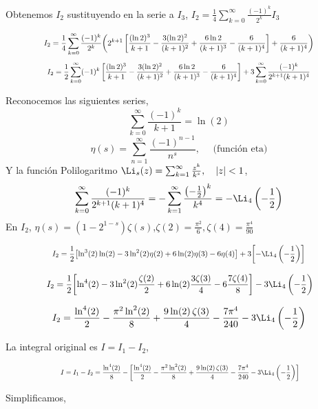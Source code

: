 { 

Obtenemos $I_2$  sustituyendo en la serie a $I_3$, $I_2 = \frac{1}{4}\sum_{k=0}^\infty \frac{(-1)^k}{2^k} I_3$
 
\begin{equation*}
	\scalebox{0.8}{$\displaystyle	I_2 = \frac{1}{4}\sum_{k=0}^\infty \frac{(-1)^k}{2^k}\pqty{  2^{k+1}\left[\frac{(\ln 2)^3}{k+1} - \frac{3(\ln 2)^2}{(k+1)^2} + \frac{6\ln 2}{(k+1)^3} - \frac{6}{(k+1)^4}\right] + \frac{6}{(k+1)^4} } $}
\end{equation*} 
\begin{equation*}
	\scalebox{0.77}{$\displaystyle	I_2 = \frac{1}{2}\sum_{k=0}^\infty (-1)^k\left[\frac{(\ln 2)^3}{k+1} - \frac{3(\ln 2)^2}{(k+1)^2} + \frac{6\ln 2}{(k+1)^3} - \frac{6}{(k+1)^4}\right] + 3\sum_{k=0}^\infty \frac{(-1)^k}{2^{k+1}(k+1)^4} $}
\end{equation*}
 

Reconocemos las siguientes series,
 $$\sum_{k=0}^\infty \frac{(-1)^k}{k+1}  = \ln(2)$$ 
 $$ \eta(s) = \sum_{n=1}^{\infty} \frac{(-1)^{n-1}}{n^s}, \quad  \text{ (función eta)} $$ 
 Y la función Polilogaritmo $\Li_s(z) = \sum_{k=1}^\infty \frac{z^k}{k^s},\quad \abs{z}<1$,
 $$
 \sum_{k=0}^\infty \frac{(-1)^k}{2^{k+1}(k+1)^4}  =
  -\sum_{k=1}^\infty \frac{\pqty{- \frac{1}{2}}^{k} }{k^4}  =-\Li_4\left(-\frac{1}{2}\right) 
  $$
En $I_2$, \quad  $\eta(s) = (1 - 2^{1-s}) \zeta(s)$,\quad $\zeta(2)=\frac{\pi^2}{6}, \zeta(4)=\frac{\pi^4}{90}$%
 
\begin{equation*}
	\scalebox{0.8}{$\displaystyle 
		I_2=\frac{1}{2}\bqty{\ln^3(2)\ln(2)- 3\ln^2(2)\eta(2)+ 6\ln(2)\eta(3)-6\eta(4)}+3\bqty{ -\Li_4\left(-\frac{1}{2}\right) }
		$}
\end{equation*}

\begin{equation*}
\scalebox{0.9}{
	$\displaystyle 
I_2=\frac{1}{2}\bqty{\ln^4(2)- 3\ln^2(2)\frac{\zeta(2)}{2}+ 6\ln(2)\frac{3\zeta(3)}{4}-6\frac{7\zeta(4)}{8}}-3\Li_4\left(-\frac{1}{2}\right) 
	$}
\end{equation*}
 
\[
I_2 = \frac{\ln^4(2)}{2} - \frac{\pi^2\ln^2(2)}{8} + \frac{9\ln (2)\,\zeta(3)}{4} - \frac{7\pi^4}{240} - 3\Li_4\left(-\frac{1}{2}\right)
\]

 La integral original es $I=I_1-I_2$,
 
 \begin{equation*}
 	\scalebox{0.7}{
 		$\displaystyle 
 		I = I_1 - I_2 = \frac{\ln^4 (2)}{8} -  \bqty{ \frac{\ln^4(2)}{2} - \frac{\pi^2\ln^2(2)}{8} + \frac{9\ln (2)\,\zeta(3)}{4} - \frac{7\pi^4}{240} - 3\Li_4\left(-\frac{1}{2}\right) }
 		$}
 \end{equation*}
  

Simplificamos, 


}
